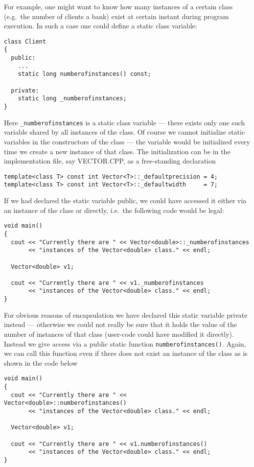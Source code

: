 For example, one might want to know how many instances of a certain
class (e.g.\ the number of clients a bank) exist at certain instant during 
program execution. In such a case one could define a static class variable:
{\footnotesize \begin{verbatim}
class Client
{
  public:
    ...
    static long numberofinstances() const;

  private:
    static long _numberofinstances;
}
\end{verbatim}}
Here \verb+_numberofinstances+ is a static class variable --- there exists only
one such variable shared by all instances of the class. Of course we cannot 
initialize static variables in the constructors of the class --- the variable
would be initialized every time we create a new instance of that class.
The initialization can be in the implementation file, say VECTOR.CPP, 
as a free-standing declaration
{\footnotesize \begin{verbatim}
template<class T> const int Vector<T>::_defaultprecision = 4;
template<class T> const int Vector<T>::_defaultwidth     = 7;
\end{verbatim}}
If we had declared  the static variable public, we could have accessed it either 
via an instance of the class or directly, i.e.\ the following code would be legal:
{\footnotesize \begin{verbatim}
void main()
{
  cout << "Currently there are " << Vector<double>::_numberofinstances
       << "instances of the Vector<double> class." << endl;

  Vector<double> v1;

  cout << "Currently there are " << v1._numberofinstances
       << "instances of the Vector<double> class." << endl;
}
\end{verbatim}}
For obvious reasons of encapsulation we have declared this static variable
private instead --- otherwise we could not really be sure that it holds the
value of the number of instances of that class (user-code could have 
modified it directly). Instead we give access via a public static function
\verb+numberofinstances()+. Again, we can call this function even if there
does not exist an instance of the class as is shown in the code below
{\footnotesize \begin{verbatim}
void main()
{
  cout << "Currently there are " << Vector<double>::numberofinstances()
       << "instances of the Vector<double> class." << endl;

  Vector<double> v1;

  cout << "Currently there are " << v1.numberofinstances()
       << "instances of the Vector<double> class." << endl;
}
\end{verbatim}}

